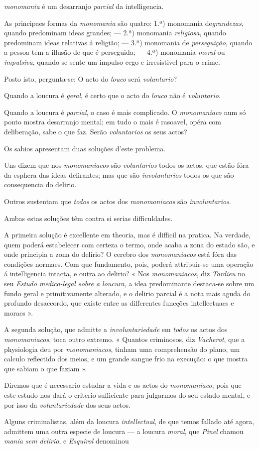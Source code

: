 \emph{monomania} é um desarranjo \emph{parcial} da intelligencia.\par As principaes formas da \emph{monomania} são quatro: 1.ª) monomania de\emph{grandezas}, quando predominam ideas grandes; --- 2.ª) monomania \emph{religiosa}, quando predominam ideas relativas á religião; --- 3.ª) monomania de \emph{perseguição}, quando a pessoa tem a illusão de que é perseguida; --- 4.ª) monomania \emph{moral} ou \emph{impulsiva}, quando se sente um impulso cego e irresistivel para o crime.\par Posto isto, pergunta-se: O acto do \emph{louco} será \emph{voluntario}?\par Quando a loucura é \emph{geral}, é certo que o acto do \emph{louco} não é \emph{voluntario}.\par Quando a loucura é \emph{parcial}, o caso é mais complicado. O \emph{monomaniaco} num só ponto mostra desarranjo mental; em tudo o mais é rasoavel, opéra com deliberação, sabe o que faz. Serão \emph{voluntarios} os seus actos?\par Os sabios apresentam duas soluções d'este problema.\par Uns dizem que nos \emph{monomaniacos} são \emph{voluntarios} todos os actos, que estão fóra da esphera das ideas delirantes; mas que são \emph{involuntarios} todos os que são consequencia do delirio.\par Outros sustentam que \emph{todos} os actos dos \emph{monomaniacos} são \emph{involuntarios}.\par Ambas estas soluções têm contra si serias difficuldades.\par A primeira solução é excellente em theoria, mas é difficil na pratica. Na verdade, quem poderá estabelecer com certeza o termo, onde acaba a zona do estado são, e onde principia a zona do delirio? O cerebro dos \emph{monomaniacos} está fóra das condições normaes. Com que fundamento, pois, poderá attribuir-se uma operação á intelligencia intacta, e outra ao delirio? « Nos \emph{monomaniacos}, diz \emph{Tardieu} no seu \emph{Estudo medico-legal sobre a loucura}, a idea predominante destaca-se sobre um fundo geral e primitivamente alterado, e o delirio parcial é a nota mais aguda do profundo desaccordo, que existe entre as differentes funcções intellectuaes e moraes ».\par A segunda solução, que admitte a \emph{involuntariedade} em \emph{todos} os actos dos \emph{monomaniacos}, toca outro extremo. « Quantos criminosos, diz \emph{Vacherot}, que a physiologia deu por \emph{monomaniacos}, tinham uma comprehensão do plano, um calculo reflectido dos meios, e um grande sangue frio na execução: o que mostra que sabiam o que faziam ».\par Diremos que é necessario estudar a vida e os actos do \emph{monomaniaco}; pois que este estudo nos dará o criterio sufficiente para julgarmos do seu estado mental, e por isso da \emph{voluntariedade} dos seus actos.\par Alguns criminalistas, além da loucura \emph{intellectual}, de que temos fallado até agora, admittem uma outra especie de loucura --- a loucura \emph{moral}, que \emph{Pinel} chamou \emph{mania sem delirio}, e \emph{Esquirol} denominou 